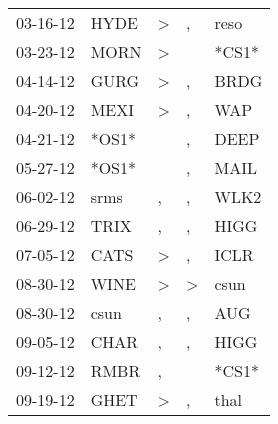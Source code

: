 \begin{supertabular}{p{0.07\textwidth}p{0.06\textwidth}p{0.02\textwidth}p{0.02\textwidth}p{0.06\textwidth}}
          03-16-12\textsuperscript{} &           HYDE\textsuperscript{} &     \textgreater &                , &           reso\textsuperscript{} \\
          03-23-12\textsuperscript{} &           MORN\textsuperscript{} &     \textgreater &                  &                            *CS1* \\
          04-14-12\textsuperscript{} &           GURG\textsuperscript{} &     \textgreater &                , &           BRDG\textsuperscript{} \\
          04-20-12\textsuperscript{} &           MEXI\textsuperscript{} &     \textgreater &                , &            WAP\textsuperscript{} \\
          04-21-12\textsuperscript{} &                            *OS1* &                  &                , &           DEEP\textsuperscript{} \\
          05-27-12\textsuperscript{} &                            *OS1* &                  &                , &           MAIL\textsuperscript{} \\
          06-02-12\textsuperscript{} &           srms\textsuperscript{} &                , &                , &           WLK2\textsuperscript{} \\
          06-29-12\textsuperscript{} &           TRIX\textsuperscript{} &                , &                , &           HIGG\textsuperscript{} \\
          07-05-12\textsuperscript{} &           CATS\textsuperscript{} &     \textgreater &                , &           ICLR\textsuperscript{} \\
          08-30-12\textsuperscript{} &           WINE\textsuperscript{} &     \textgreater &     \textgreater &           csun\textsuperscript{} \\
          08-30-12\textsuperscript{} &           csun\textsuperscript{} &                , &                , &            AUG\textsuperscript{} \\
          09-05-12\textsuperscript{} &           CHAR\textsuperscript{} &                , &                , &           HIGG\textsuperscript{} \\
          09-12-12\textsuperscript{} &           RMBR\textsuperscript{} &                , &                  &                            *CS1* \\
          09-19-12\textsuperscript{} &           GHET\textsuperscript{} &     \textgreater &                , &           thal\textsuperscript{} \\

\end{supertabular}
